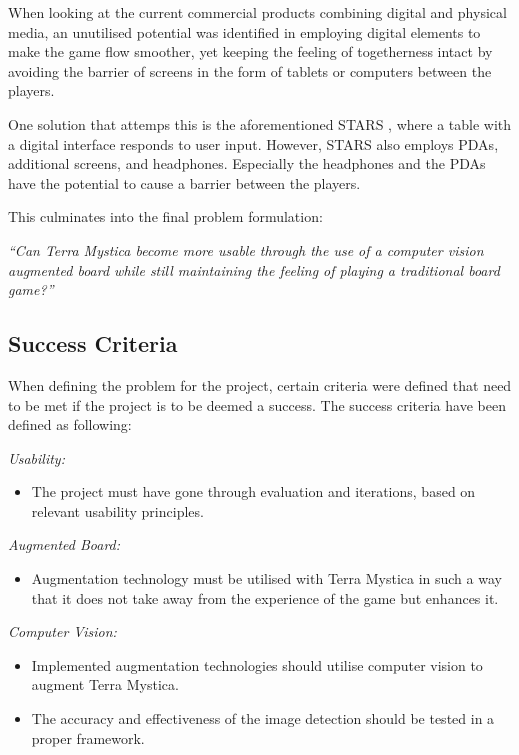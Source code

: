 When looking at the current commercial products combining digital and physical media, an unutilised potential was identified in employing digital elements to make the game flow smoother, yet keeping the feeling of togetherness intact by avoiding the barrier of screens in the form of tablets or computers between the players. 

One solution that attemps this is the aforementioned STARS \citep{magStars}, where a table with a digital interface responds to user input. However, STARS also employs PDAs, additional screens, and headphones. Especially the headphones and the PDAs have the potential to cause a barrier between the players.

This culminates into the final problem formulation:

\textit{“Can Terra Mystica become more usable through the use of a computer vision augmented board while still maintaining the feeling of playing a traditional board game?”}

\subsection{Success Criteria}
When defining the problem for the project, certain criteria were defined that need to be met if the project is to be deemed a success. The success criteria have been defined as following:

\textit{Usability:}
\begin{itemize}
	\item The project must have gone through evaluation and iterations, based on relevant usability principles.
\end{itemize}
\textit{Augmented Board:}
\begin{itemize}
	\item Augmentation technology must be utilised with Terra Mystica in such a way that it does not take away from the experience of the game but enhances it.
\end{itemize}
\textit{Computer Vision:}
\begin{itemize}
	\item Implemented augmentation technologies should utilise computer vision to augment Terra Mystica.
	\item The accuracy and effectiveness of the image detection should be tested in a proper framework.
\end{itemize} 